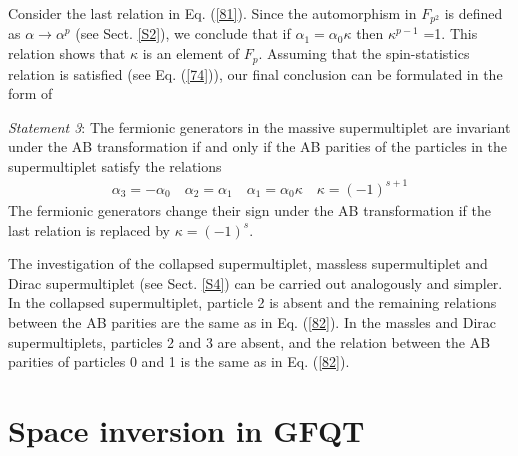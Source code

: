 \documentclass[a4paper,12pt]{article}%
\begin{document}
Consider the last relation in Eq. (\ref{81}). Since the
automorphism in $F_{p^2}$ is defined as 
$\alpha \rightarrow \alpha^p$ (see Sect. \ref{S2}), we
conclude that if $\alpha_1=\alpha_0\kappa$ then 
$\kappa^{p-1}$ =1. This relation shows that 
$\kappa$ is an element of $F_p$. Assuming that the
spin-statistics relation is satisfied (see Eq. (\ref{74})),
our final conclusion can be formulated in the form
of

{\it Statement 3}: The fermionic generators in the
massive supermultiplet are invariant
under the AB transformation if and only if the AB
parities of the particles in the supermultiplet satisfy 
the relations
\begin{eqnarray}
\alpha_3=-\alpha_0\quad \alpha_2=\alpha_1\quad 
\alpha_1=\alpha_0\kappa\quad \kappa =(-1)^{s+1}
\label{82}
\end{eqnarray}
The fermionic generators change their sign under the
AB transformation if the last relation is replaced by
$\kappa=(-1)^s$.

The investigation of the collapsed supermultiplet,
massless supermultiplet and Dirac supermultiplet
(see Sect. \ref{S4}) can be carried out analogously
and simpler. In the collapsed supermultiplet,
particle 2 is absent and the remaining relations
between the AB parities are the same as in Eq. (\ref{82}).
In the massles and Dirac supermultiplets, particles
2 and 3 are absent, and the relation between the
AB parities of particles 0 and 1 is the same as in
Eq. (\ref{82}).

\section{Space inversion in GFQT}
\label{S8} 
\end{document}
